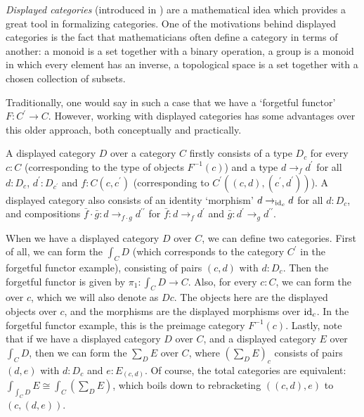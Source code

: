 \textit{Displayed categories} (introduced in \autocite{displayed-categories}) are a mathematical idea which provides a great tool in formalizing categories. One of the motivations behind displayed categories is the fact that mathematicians often define a category in terms of another: a monoid is a set together with a binary operation, a group is a monoid in which every element has an inverse, a topological space is a set together with a chosen collection of subsets.

Traditionally, one would say in such a case that we have a `forgetful functor' $ F : C^\prime \to C $. However, working with displayed categories has some advantages over this older approach, both conceptually and practically.

A displayed category $ D $ over a category $ C $ firstly consists of a type $ D_c $ for every $ c : C $ (corresponding to the type of objects $ F^{-1}(c) $) and a type $ d \to_f d^\prime $ for all $ d: D_c $, $ d^\prime : D_{c^\prime} $ and $ f : C(c, c^\prime) $ (corresponding to $ C^\prime((c, d), (c^\prime, d^\prime)) $). A displayed category also consists of an identity `morphism' $ d \to_{\text{id}_{c}} d $ for all $ d : D_c $, and compositions $ \bar f \cdot \bar g : d \to_{f \cdot g} d^{\prime \prime} $ for $ \bar f : d \to_f d^\prime $ and $ \bar g : d^\prime \to_g d^{\prime \prime} $.

When we have a displayed category $ D $ over $ C $, we can define two categories. First of all, we can form the  $ \int_C D $ (which corresponds to the category $ C^\prime $ in the forgetful functor example), consisting of pairs $ (c, d) $ with $ d : D_c $. Then the forgetful functor is given by $ \pi_1 : \int_C D \to C $. Also, for every $ c : C $, we can form the  over $ c $, which we will also denote as $ D c $. The objects here are the displayed objects over $ c $, and the morphisms are the displayed morphisms over $ \text{id}_{c} $. In the forgetful functor example, this is the preimage category $ F^{-1}(c) $. Lastly, note that if we have a displayed category $ D $ over $ C $, and a displayed category $ E $ over $ \int_C D $, then we can form the  $ \sum_D E $ over $ C $, where $ (\sum_D E)_c $ consists of pairs $ (d, e) $ with $ d : D_c $ and $ e : E_{(c, d)} $. Of course, the total categories are equivalent: $ \int_{\int_C D} E \cong \int_C (\sum_D E) $, which boils down to rebracketing $ ((c, d), e) $ to $ (c, (d, e)) $.

